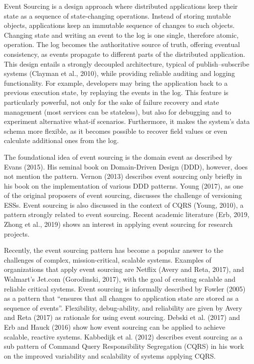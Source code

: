 Event Sourcing is a design approach where distributed applications keep their state as a sequence of state-changing operations. Instead of storing mutable objects, applications keep an immutable sequence of changes to such objects. Changing state and writing an event to the log is one single, therefore atomic, operation. The log becomes the authoritative source of truth, offering eventual consistency, as events propagate to different parts of the distributed application. This design entails a strongly decoupled architecture, typical of publish–subscribe systems (Clayman et al., 2010), while providing reliable auditing and logging functionality. For example, developers may bring the application back to a previous execution state, by replaying the events in the log. This feature is particularly powerful, not only for the sake of failure recovery and state management (most services can be stateless), but also for debugging and to experiment alternative what-if scenarios. Furthermore, it makes the system’s data schema more flexible, as it becomes possible to recover field values or even calculate additional ones from the log.

The foundational idea of event sourcing is the domain event as described by Evans (2015). His seminal book on Domain-Driven Design (DDD), however, does not mention the pattern. Vernon (2013) describes event sourcing only briefly in his book on the implementation of various DDD patterns. Young (2017), as one of the original proposers of event sourcing, discusses the challenge of versioning ESSs. Event sourcing is also discussed in the context of CQRS (Young, 2010), a pattern strongly related to event sourcing. Recent academic literature (Erb, 2019, Zhong et al., 2019) shows an interest in applying event sourcing for research projects.

Recently, the event sourcing pattern has become a popular answer to the challenges of complex, mission-critical, scalable systems. Examples of organizations that apply event sourcing are Netflix (Avery and Reta, 2017), and Walmart’s Jet.com (Gorodinski, 2017), with the goal of creating scalable and reliable critical systems. Event sourcing is informally described by Fowler (2005) as a pattern that “ensures that all changes to application state are stored as a sequence of events”. Flexibility, debug-ability, and reliability are given by Avery and Reta (2017) as rationale for using event sourcing. Debski et al. (2017) and Erb and Hauck (2016) show how event sourcing can be applied to achieve scalable, reactive systems. Kabbedijk et al. (2012) describes event sourcing as a sub pattern of Command Query Responsibility Segregation (CQRS) in his work on the improved variability and scalability of systems applying CQRS.

